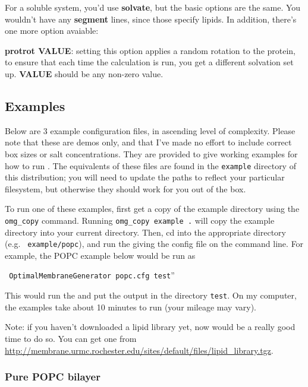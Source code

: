 \documentclass[12pt]{article}
\begin{document}
For a soluble system, you'd use {\bf solvate}, but the basic options are the
same.  You wouldn't have any {\bf segment} lines, since those specify lipids.
In addition, there's one more option avaiable:

{\bf protrot VALUE}: setting this option applies a random rotation to the
protein, to ensure that each time the calculation is run, you get a different
solvation set up.  {\bf VALUE} should be any non-zero value.

\subsection{Examples}
\label{ss:examples}

Below are 3 example configuration files, in ascending level of complexity.
Please note that these are demos only, and that I've made no effort to
include correct box sizes or salt concentrations.  They are provided to
give working examples for how to run \omgwtf.  The equivalents of these
files are found in the {\tt example} directory of this distribution; you
will need to update the paths to reflect your particular filesystem, but
otherwise they should work for you out of the box.

To run one of these examples, first get a copy of the example directory
using the {\tt omg\_copy} command.  Running {\tt omg\_copy example .} will copy
the example directory into your current directory.  Then, 
cd into the appropriate directory (e.g. {\tt
example/popc}), and run the {\omgwtf} giving the config file on the command
line.  For example, the POPC example below would be run as

{\tt
OptimalMembraneGenerator popc.cfg test}''

This would run the
{\omgwtf} and put the output in the directory {\tt test}.  On my computer,
the examples take about 10 minutes to run (your mileage may vary).

Note: if you haven't downloaded a lipid library yet, now would be a really
good time to do so.  You can get one from
\url{http://membrane.urmc.rochester.edu/sites/default/files/lipid_library.tgz}.


\subsubsection{Pure POPC bilayer}
\end{document}
